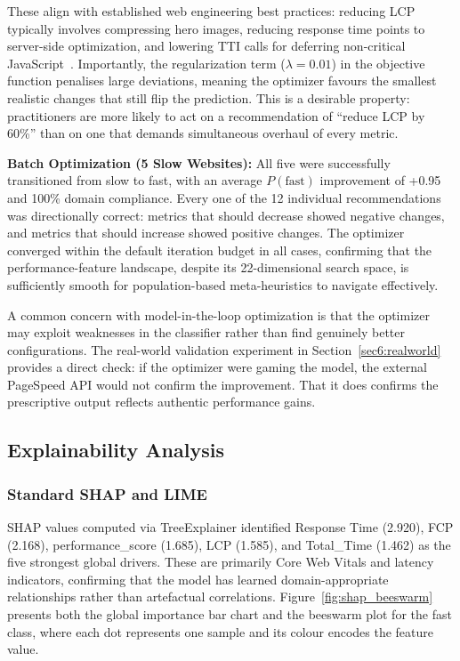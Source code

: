 \documentclass[sn-nature]{sn-jnl}
\begin{document}
These align with established web engineering best practices: reducing LCP typically involves compressing hero images, reducing response time points to server-side optimization, and lowering TTI calls for deferring non-critical JavaScript~\cite{vanriet2023, surianarayanan2023}. Importantly, the regularization term ($\lambda = 0.01$) in the objective function penalises large deviations, meaning the optimizer favours the smallest realistic changes that still flip the prediction. This is a desirable property: practitioners are more likely to act on a recommendation of ``reduce LCP by 60\%'' than on one that demands simultaneous overhaul of every metric.

\textbf{Batch Optimization (5 Slow Websites):} All five were successfully transitioned from slow to fast, with an average $P(\text{fast})$ improvement of +0.95 and 100\% domain compliance. Every one of the 12 individual recommendations was directionally correct: metrics that should decrease showed negative changes, and metrics that should increase showed positive changes. The optimizer converged within the default iteration budget in all cases, confirming that the performance-feature landscape, despite its 22-dimensional search space, is sufficiently smooth for population-based meta-heuristics to navigate effectively.

A common concern with model-in-the-loop optimization is that the optimizer may exploit weaknesses in the classifier rather than find genuinely better configurations. The real-world validation experiment in Section~\ref{sec6:realworld} provides a direct check: if the optimizer were gaming the model, the external PageSpeed API would not confirm the improvement. That it does confirms the prescriptive output reflects authentic performance gains.

\subsection{Explainability Analysis}

\subsubsection{Standard SHAP and LIME}\label{sec6:shap_lime}

SHAP values computed via TreeExplainer identified Response Time (2.920), FCP (2.168), performance\_score (1.685), LCP (1.585), and Total\_Time (1.462) as the five strongest global drivers. These are primarily Core Web Vitals and latency indicators, confirming that the model has learned domain-appropriate relationships rather than artefactual correlations. Figure~\ref{fig:shap_beeswarm} presents both the global importance bar chart and the beeswarm plot for the fast class, where each dot represents one sample and its colour encodes the feature value.
\end{document}
